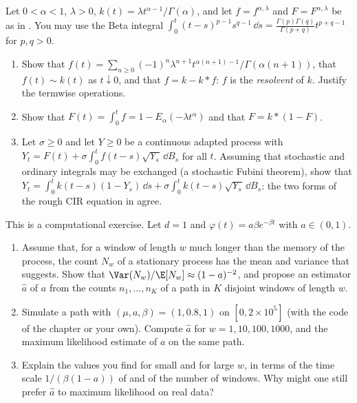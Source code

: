 \begin{exercise}\label{ex:hk-mittag-leffler}
\hard Let $0<\alpha<1$, $\lambda>0$, $k(t)=\lambda t^{\alpha-1}/\Gamma(\alpha)$, and let $f=f^{\alpha,\lambda}$ and
$F=F^{\alpha,\lambda}$ be as in . You may use the Beta integral
$\int_0^t(t-s)^{p-1}s^{q-1}\,\dd s=\frac{\Gamma(p)\Gamma(q)}{\Gamma(p+q)}t^{p+q-1}$ for $p,q>0$.
\begin{enumerate}[label=(\alph*)]
  \item Show that $f(t)=\sum_{n\ge0}(-1)^n\lambda^{n+1}t^{\alpha(n+1)-1}/\Gamma(\alpha(n+1))$, that
    $f(t)\sim k(t)$ as $t\downarrow0$, and that $f=k-k*f$: $f$ is the \emph{resolvent} of $k$. Justify the
    termwise operations.
  \item Show that $F(t)=\int_0^tf=1-E_\alpha(-\lambda t^\alpha)$ and that $F=k*(1-F)$.
  \item Let $\sigma\ge0$ and let $Y\ge0$ be a continuous adapted process with
    $Y_t=F(t)+\sigma\int_0^tf(t-s)\sqrt{Y_s}\,\dd B_s$ for all $t$. Assuming that stochastic and ordinary integrals may
    be exchanged (a stochastic Fubini theorem), show that
    $Y_t=\int_0^tk(t-s)(1-Y_s)\,\dd s+\sigma\int_0^tk(t-s)\sqrt{Y_s}\,\dd B_s$: the two forms of the rough CIR equation
    in  agree.
\end{enumerate}
\end{exercise}

\begin{exercise}\label{ex:hk-moment-estimator}
\medium This is a computational exercise. Let $d=1$ and $\varphi(t)=a\beta e^{-\beta t}$ with $a\in(0,1)$.
\begin{enumerate}[label=(\alph*)]
  \item Assume that, for a window of length $w$ much longer than the memory of the process, the count $N_w$ of a
    stationary process has the mean and variance that  suggests. Show that
    $\Var(N_w)/\E[N_w]\approx(1-a)^{-2}$, and propose an estimator $\hat a$ of $a$ from the counts $n_1,\dots,n_K$ of a
    path in $K$ disjoint windows of length $w$.
  \item Simulate a path with $(\mu,a,\beta)=(1,0.8,1)$ on $[0,2\times10^5]$ (with the code of the chapter or your
    own). Compute $\hat a$ for $w=1,10,100,1000$, and the maximum likelihood estimate of $a$ on the same path.
  \item Explain the values you find for small and for large $w$, in terms of the time scale $1/(\beta(1-a))$ of
     and of the number of windows. Why might one still prefer $\hat a$ to maximum likelihood on
    real data?
\end{enumerate}
\end{exercise}
